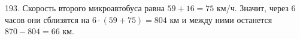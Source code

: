 193. Скорость второго микроавтобуса равна $59+16=75$ км/ч. Значит, через 6 часов они сблизятся на $6\cdot(59+75)=804$ км и между ними останется $870-804=66$ км.\\
